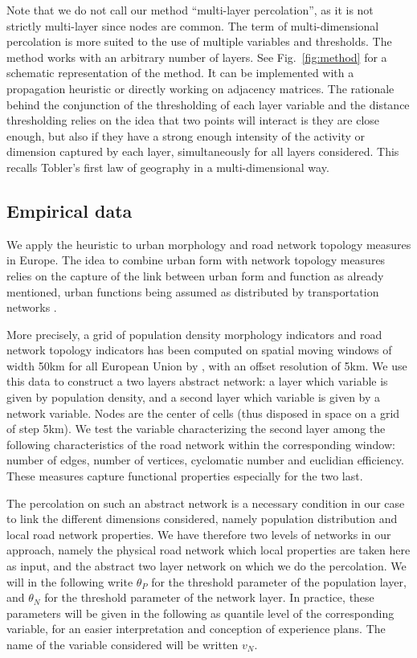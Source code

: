 \documentclass{jimis-en}
\begin{document}
Note that we do not call our method ``multi-layer percolation'', as it is not strictly multi-layer since nodes are common. The term of multi-dimensional percolation is more suited to the use of multiple variables and thresholds. The method works with an arbitrary number of layers. See Fig.~\ref{fig:method} for a schematic representation of the method. It can be implemented with a propagation heuristic or directly working on adjacency matrices. The rationale behind the conjunction of the thresholding of each layer variable and the distance thresholding relies on the idea that two points will interact is they are close enough, but also if they have a strong enough intensity of the activity or dimension captured by each layer, simultaneously for all layers considered. This recalls Tobler's first law of geography \citep{tobler2004first} in a multi-dimensional way.



\subsection{Empirical data}


We apply the heuristic to urban morphology and road network topology measures in Europe. The idea to combine urban form with network topology measures relies on the capture of the link between urban form and function as already mentioned, urban functions being assumed as distributed by transportation networks \citep{raimbault2018caracterisation}.

More precisely, a grid of population density morphology indicators and road network topology indicators has been computed on spatial moving windows of width 50km for all European Union by \cite{raimbault2018urban}, with an offset resolution of 5km. We use this data to construct a two layers abstract network: a layer which variable is given by population density, and a second layer which variable is given by a network variable. Nodes are the center of cells (thus disposed in space on a grid of step 5km). We test the variable characterizing the second layer among the following characteristics of the road network within the corresponding window: number of edges, number of vertices, cyclomatic number and euclidian efficiency. These measures capture functional properties especially for the two last.

The percolation on such an abstract network is a necessary condition in our case to link the different dimensions considered, namely population distribution and local road network properties. We have therefore two levels of networks in our approach, namely the physical road network which local properties are taken here as input, and the abstract two layer network on which we do the percolation. We will in the following write $\theta_P$ for the threshold parameter of the population layer, and $\theta_N$ for the threshold parameter of the network layer. In practice, these parameters will be given in the following as quantile level of the corresponding variable, for an easier interpretation and conception of experience plans. The name of the variable considered will be written $v_N$.
\end{document}
